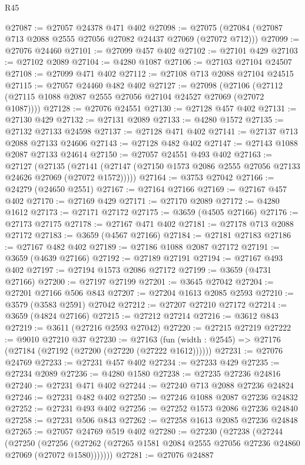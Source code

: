 \begin{lexlean}{R45}
\begin{coremodule}
@27087 := @27057 @24378 @471 @402
@27098 := @27075 (@27084 (@27087 @713 @2088 @2555 @27056 @27082 @24437 @27069 (@27072 @712)))
@27099 := @27076 @24460
@27101 := @27099 @457 @402
@27102 := @27101 @429
@27103 := @27102 @2089
@27104 := @4280 @1087
@27106 := @27103 @27104 @24507
@27108 := @27099 @471 @402
@27112 := @27108 @713 @2088 @27104 @24515
@27115 := @27057 @24460 @482 @402
@27127 := @27098
    (@27106 (@27112 (@27115 @1088 @2087 @2555 @27056 @27104 @24527 @27069 (@27072 @1087))))
@27128 := @27076 @24551
@27130 := @27128 @457 @402
@27131 := @27130 @429
@27132 := @27131 @2089
@27133 := @4280 @1572
@27135 := @27132 @27133 @24598
@27137 := @27128 @471 @402
@27141 := @27137 @713 @2088 @27133 @24606
@27143 := @27128 @482 @402
@27147 := @27143 @1088 @2087 @27133 @24614
@27150 := @27057 @24551 @493 @402
@27163 := @27127
    (@27135 (@27141 (@27147 (@27150 @1573 @2086 @2555 @27056 @27133 @24626 @27069 (@27072 @1572)))))
@27164 := @3753 @27042
@27166 := @24279 (@24650 @2551)
@27167 := @27164 @27166
@27169 := @27167 @457 @402
@27170 := @27169 @429
@27171 := @27170 @2089
@27172 := @4280 @1612
@27173 := @27171 @27172
@27175 := @3659 (@4505 @27166)
@27176 := @27173 @27175
@27178 := @27167 @471 @402
@27181 := @27178 @713 @2088 @27172
@27183 := @3659 (@4567 @27166)
@27184 := @27181 @27183
@27186 := @27167 @482 @402
@27189 := @27186 @1088 @2087 @27172
@27191 := @3659 (@4639 @27166)
@27192 := @27189 @27191
@27194 := @27167 @493 @402
@27197 := @27194 @1573 @2086 @27172
@27199 := @3659 (@4731 @27166)
@27200 := @27197 @27199
@27201 := @3645 @27042
@27204 := @27201 @27166 @506 @843
@27207 := @27204 @1613 @2085 @2593
@27210 := @3579 (@3583 @2591) @27042
@27212 := @27207 @27210 @27172
@27214 := @3659 (@4824 @27166)
@27215 := @27212 @27214
@27216 := @3612 @843
@27219 := @3611 (@27216 @2593 @27042)
@27220 := @27215 @27219
@27222 := @9010 @27210 @37
@27230 := @27163 (fun (width : @2545) => @27176 (@27184 (@27192 (@27200 (@27220 (@27222 @1612))))))
@27231 := @27076 @24769
@27233 := @27231 @457 @402
@27234 := @27233 @429
@27235 := @27234 @2089
@27236 := @4280 @1580
@27238 := @27235 @27236 @24816
@27240 := @27231 @471 @402
@27244 := @27240 @713 @2088 @27236 @24824
@27246 := @27231 @482 @402
@27250 := @27246 @1088 @2087 @27236 @24832
@27252 := @27231 @493 @402
@27256 := @27252 @1573 @2086 @27236 @24840
@27258 := @27231 @506 @843
@27262 := @27258 @1613 @2085 @27236 @24848
@27265 := @27057 @24769 @519 @402
@27280 := @27230
    (@27238
      (@27244
        (@27250
          (@27256 (@27262 (@27265 @1581 @2084 @2555 @27056 @27236 @24860 @27069 (@27072 @1580)))))))
@27281 := @27076 @24887

\end{coremodule}
\end{lexlean}
